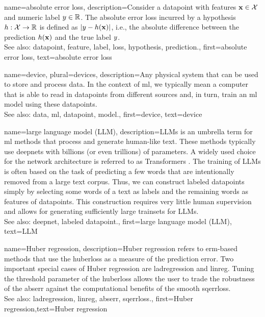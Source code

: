 {name={absolute error loss},
	description={Consider a \gls{datapoint} with \glspl{feature} ${\bf x} \in \mathcal{X}$ and numeric 
		\gls{label} $y \in \mathbb{R}$. The absolute error \gls{loss} 
		incurred by a \gls{hypothesis} $h: \mathcal{X} \rightarrow \mathbb{R}$ 
		is defined as $|y - h({\bf x})|$, i.e., the absolute difference between 
		the \gls{prediction} $h({\bf x})$ and the true \gls{label} $y$.
					\\
		See also: \gls{datapoint}, \gls{feature}, \gls{label}, \gls{loss}, \gls{hypothesis}, \gls{prediction}.},
	first={absolute error loss},
	text={absolute error loss}
}

{name={device}, plural={devices}, 
	description={Any physical system that can be used to store and process \gls{data}. In the context of \gls{ml}, 
		we typically mean a computer that is able to read in \glspl{datapoint} from different 
		sources and, in turn, train an \gls{ml} \gls{model} using these \glspl{datapoint}.
						\\
		See also: \gls{data}, \gls{ml}, \gls{datapoint}, \gls{model}.},
	first={device},
	text={device}
}

{name={large language model (LLM)},
	description={LLMs is an umbrella term for \gls{ml} methods 
		that process and generate human-like text. These methods typically 
		use \glspl{deepnet} with billions (or even trillions) of \glspl{parameter}. 
		A widely used choice for the network architecture is referred to as 
		Transformers \cite{vaswani2017attention}. The training of LLMs is often  
		based on the task of predicting a few words that are intentionally removed 
		from a large text corpus. Thus, we can construct \glspl{labeled datapoint} 
		simply by selecting some words of a text as \glspl{label} and the remaining 
		words as \glspl{feature} of \glspl{datapoint}. This construction requires 
		very little human supervision and allows for generating sufficiently 
		large \glspl{trainset} for LLMs.
			\\
		See also: \gls{deepnet}, \gls{labeled datapoint}.},
		first={large language model (LLM)},
		text={LLM}
}


{name={Huber regression},
 description={Huber \gls{regression} refers to \gls{erm}-based methods 
			that use the \gls{huberloss} as a measure of the \gls{prediction} error. Two important special cases 
			of Huber \gls{regression} are \gls{ladregression} and \gls{linreg}. Tuning the threshold \gls{parameter} 
			of the \gls{huberloss} allows the user to trade the \gls{robustness} of the \gls{abserr} against 
			the computational benefits of the \gls{smooth} \gls{sqerrloss}.
					\\
		See also: \gls{ladregression}, \gls{linreg}, \gls{abserr}, \gls{sqerrloss}.},
			first={Huber regression},text={Huber regression}}


